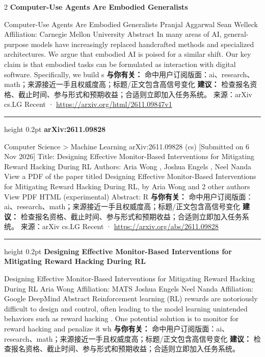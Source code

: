 \documentclass[10.5pt]{ctexart}
\begin{document}
\begin{multicols}{2}
{\large\bfseries Computer-Use Agents Are Embodied Generalists}\par
Computer-Use Agents Are Embodied Generalists Pranjal Aggarwal Sean Welleck Affiliation: Carnegie Mellon University Abstract In many areas of AI, general-purpose models have increasingly replaced handcrafted methods and specialized architectures. We argue that embodied AI is poised for a similar shift. Our key claim is that embodied tasks can be formulated as interaction with digital software. Specifically, we build s
\textbf{与你有关：} 命中用户订阅版面：ai、research、math；来源接近一手且权威度高；标题/正文包含高信号变化
\textbf{建议：} 检查报名资格、截止时间、参与形式和预期收益；合适则立即加入任务系统。
{\footnotesize\color{ormuted} 来源：arXiv cs.LG Recent · \url{https://arxiv.org/html/2611.09847v1}}
\vspace{2mm}
\hrule height 0.2pt
\vspace{2mm}
{\large\bfseries arXiv:2611.09828}\par
Computer Science > Machine Learning arXiv:2611.09828 (cs) [Submitted on 6 Nov 2026] Title: Designing Effective Monitor-Based Interventions for Mitigating Reward Hacking During RL Authors: Aria Wong , Joshua Engels , Neel Nanda View a PDF of the paper titled Designing Effective Monitor-Based Interventions for Mitigating Reward Hacking During RL, by Aria Wong and 2 other authors View PDF HTML (experimental) Abstract: R
\textbf{与你有关：} 命中用户订阅版面：ai、research、math；来源接近一手且权威度高；标题/正文包含高信号变化
\textbf{建议：} 检查报名资格、截止时间、参与形式和预期收益；合适则立即加入任务系统。
{\footnotesize\color{ormuted} 来源：arXiv cs.LG Recent · \url{https://arxiv.org/abs/2611.09828}}
\vspace{2mm}
\hrule height 0.2pt
\vspace{2mm}
{\large\bfseries Designing Effective Monitor-Based Interventions for Mitigating Reward Hacking During RL}\par
Designing Effective Monitor-Based Interventions for Mitigating Reward Hacking During RL Aria Wong Affiliation: MATS Joshua Engels Neel Nanda Affiliation: Google DeepMind Abstract Reinforcement learning (RL) rewards are notoriously difficult to design and control, often leading to the model learning unintended behaviors such as reward hacking . One potential solution is to monitor for reward hacking and penalize it wh
\textbf{与你有关：} 命中用户订阅版面：ai、research、math；来源接近一手且权威度高；标题/正文包含高信号变化
\textbf{建议：} 检查报名资格、截止时间、参与形式和预期收益；合适则立即加入任务系统。

\end{multicols}
\end{document}
